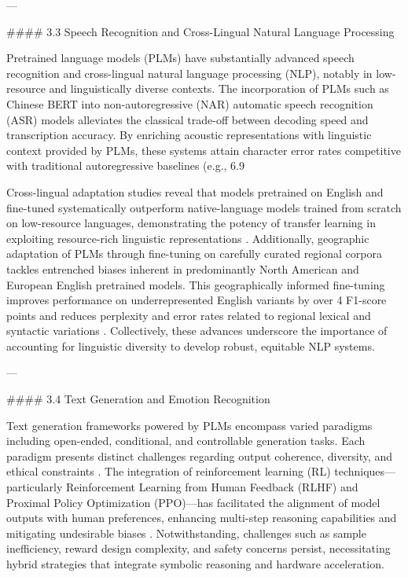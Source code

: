 \documentclass[11pt]{article}
\begin{document}
---

#### 3.3 Speech Recognition and Cross-Lingual Natural Language Processing

Pretrained language models (PLMs) have substantially advanced speech recognition and cross-lingual natural language processing (NLP), notably in low-resource and linguistically diverse contexts. The incorporation of PLMs such as Chinese BERT into non-autoregressive (NAR) automatic speech recognition (ASR) models alleviates the classical trade-off between decoding speed and transcription accuracy. By enriching acoustic representations with linguistic context provided by PLMs, these systems attain character error rates competitive with traditional autoregressive baselines (e.g., 6.9%

Cross-lingual adaptation studies reveal that models pretrained on English and fine-tuned systematically outperform native-language models trained from scratch on low-resource languages, demonstrating the potency of transfer learning in exploiting resource-rich linguistic representations \cite{ref31}. Additionally, geographic adaptation of PLMs through fine-tuning on carefully curated regional corpora tackles entrenched biases inherent in predominantly North American and European English pretrained models. This geographically informed fine-tuning improves performance on underrepresented English variants by over 4 F1-score points and reduces perplexity and error rates related to regional lexical and syntactic variations \cite{ref30}. Collectively, these advances underscore the importance of accounting for linguistic diversity to develop robust, equitable NLP systems.

---

#### 3.4 Text Generation and Emotion Recognition

Text generation frameworks powered by PLMs encompass varied paradigms including open-ended, conditional, and controllable generation tasks. Each paradigm presents distinct challenges regarding output coherence, diversity, and ethical constraints \cite{ref39}. The integration of reinforcement learning (RL) techniques—particularly Reinforcement Learning from Human Feedback (RLHF) and Proximal Policy Optimization (PPO)—has facilitated the alignment of model outputs with human preferences, enhancing multi-step reasoning capabilities and mitigating undesirable biases \cite{ref9}. Notwithstanding, challenges such as sample inefficiency, reward design complexity, and safety concerns persist, necessitating hybrid strategies that integrate symbolic reasoning and hardware acceleration.
\end{document}
